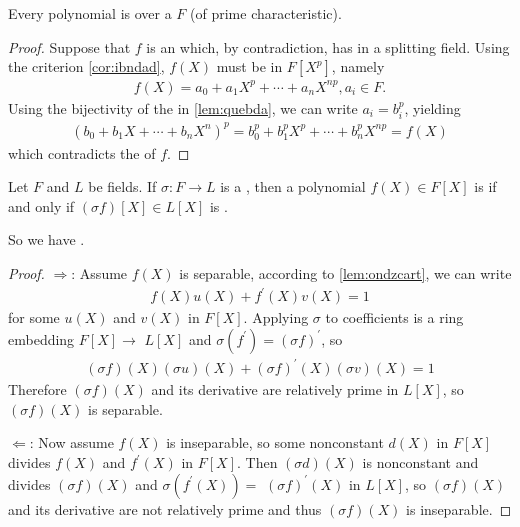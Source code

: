 \documentclass{article}
\begin{document}
\begin{thma}\label{thm:doamra}
Every polynomial is  over a  $F$ (of prime characteristic).
\end{thma} 
\begin{proof}
Suppose that $f$ is an  which, by contradiction, has  in a splitting field. Using the criterion \cref{cor:ibndad}, $f(X)$ must be in $F\left[X^{p}\right]$, namely
\begin{align*}
f(X)=a_{0}+a_{1} X^{p}+\cdots+a_{n} X^{n p}, a_{i} \in F .
\end{align*}
Using the bijectivity of the  in \cref{lem:quebda}, we can write $a_{i}=b_{i}^{p}$, yielding
\begin{align*}
\left(b_{0}+b_{1} X+\cdots+b_{n} X^{n}\right)^{p}=b_{0}^{p}+b_{1}^{p} X^{p}+\cdots+b_{n}^{p} X^{n p}=f(X)
\end{align*}
which contradicts the  of $f$.
\end{proof}


\begin{cora}
    Let $F$ and $L$ be fields. If $\sigma: F \rightarrow L$ is a , then a polynomial $f(X) \in F[X]$ is  if and only if $(\sigma f)[X] \in L[X]$ is .
\end{cora} 
\begin{rema}
So we have  .
\end{rema}
\begin{proof}
$\Rightarrow$: 
Assume $f(X)$ is separable, according to \cref{lem:ondzcart}, we can write
\begin{align*}
f(X) u(X)+f^{\prime}(X) v(X)=1
\end{align*}
for some $u(X)$ and $v(X)$ in $F[X]$. Applying $\sigma$ to coefficients is a ring embedding $F[X] \rightarrow$ $L[X]$ and $\sigma\left(f^{\prime}\right)=(\sigma f)^{\prime}$, so
\begin{align*}
(\sigma f)(X)(\sigma u)(X)+(\sigma f)^{\prime}(X)(\sigma v)(X)=1
\end{align*}
Therefore $(\sigma f)(X)$ and its derivative are relatively prime in $L[X]$, so $(\sigma f)(X)$ is separable.

$\Leftarrow$: 
Now assume $f(X)$ is inseparable, so some nonconstant $d(X)$ in $F[X]$ divides $f(X)$ and $f^{\prime}(X)$ in $F[X]$. Then $(\sigma d)(X)$ is nonconstant and divides $(\sigma f)(X)$ and $\sigma\left(f^{\prime}(X)\right)=$ $(\sigma f)^{\prime}(X)$ in $L[X]$, so $(\sigma f)(X)$ and its derivative are not relatively prime and thus $(\sigma f)(X)$ is inseparable.
\end{proof} 
\end{document}
